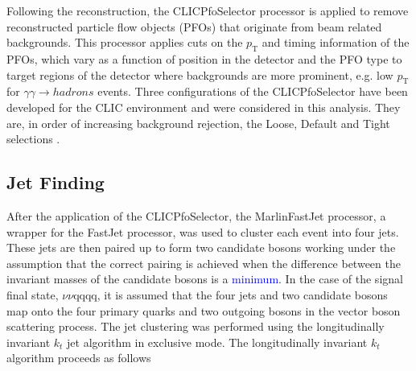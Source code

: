 Following the reconstruction, the CLICPfoSelector processor \cite{arXiv:1209.4039} is applied to remove reconstructed particle flow objects (PFOs) that originate from beam related backgrounds.  This processor applies cuts on the $p_{\text{T}}$ and timing information of the PFOs, which vary as a function of position in the detector and the PFO type to target regions of the detector where backgrounds are more prominent, e.g. low $p_{\text{T}}$ for $\gamma\gamma \rightarrow hadrons$ events.  Three configurations of the CLICPfoSelector  have been developed for the CLIC environment and were considered in this analysis.  They are, in order of increasing background rejection, the Loose, Default and Tight selections \cite{arXiv:1209.4039}. 


\subsection{Jet Finding} 
\label{sec:jetpairing}
After the application of the CLICPfoSelector, the MarlinFastJet processor, a wrapper for the FastJet \cite{Cacciari:2011ma} processor, was used to cluster each event into four jets.  These jets are then paired up to form two candidate bosons working under the assumption that the correct pairing is achieved when the difference between the invariant masses of the candidate bosons is a \textcolor{blue}{minimum}.  In the case of the signal final state, $\nu\nu$qqqq, it is assumed that the four jets and two candidate bosons map onto the four primary quarks and two outgoing bosons in the vector boson scattering process.  The jet clustering was performed using the longitudinally invariant $k_{t}$ jet algorithm \cite{Catani:1993hr, Ellis:1993tq} in exclusive mode.  The longitudinally invariant $k_{t}$ algorithm proceeds as follows

